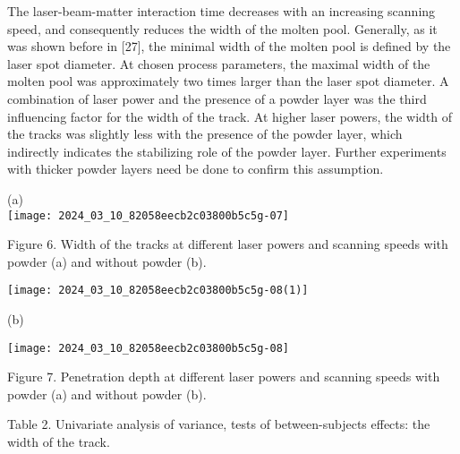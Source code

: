 \documentclass[10pt]{article}
\begin{document}
The laser-beam-matter interaction time decreases with an increasing scanning speed, and consequently reduces the width of the molten pool. Generally, as it was shown before in [27], the minimal width of the molten pool is defined by the laser spot diameter. At chosen process parameters, the maximal width of the molten pool was approximately two times larger than the laser spot diameter. A combination of laser power and the presence of a powder layer was the third influencing factor for the width of the track. At higher laser powers, the width of the tracks was slightly less with the presence of the powder layer, which indirectly indicates the stabilizing role of the powder layer. Further experiments with thicker powder layers need be done to confirm this assumption.

(a)\\
\texttt{[image: 2024\_03\_10\_82058eecb2c03800b5c5g-07]}

Figure 6. Width of the tracks at different laser powers and scanning speeds with powder (a) and without powder (b).

\begin{center}
\texttt{[image: 2024\_03\_10\_82058eecb2c03800b5c5g-08(1)]}
\end{center}

(b)

\begin{center}
\texttt{[image: 2024\_03\_10\_82058eecb2c03800b5c5g-08]}
\end{center}

Figure 7. Penetration depth at different laser powers and scanning speeds with powder (a) and without powder (b).

Table 2. Univariate analysis of variance, tests of between-subjects effects: the width of the track.
\end{document}
